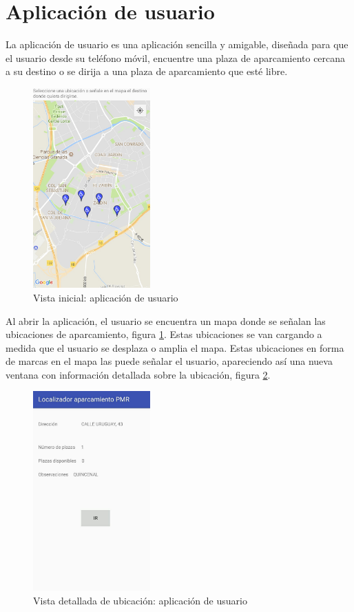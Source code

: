 \newpage
\section{Aplicación de usuario}
La aplicación de usuario es una aplicación sencilla y amigable, diseñada para que el usuario desde su teléfono móvil, encuentre una plaza de aparcamiento cercana a su destino o se dirija a una plaza de aparcamiento que esté libre.
\begin{figure}[H]
	\centering
	\includegraphics[width=0.4\textwidth]{imagenes/app/1.jpg}
	\caption{Vista inicial: aplicación de usuario}
	\label{app_1}
\end{figure}
Al abrir la aplicación, el usuario se encuentra un mapa donde se señalan las ubicaciones de aparcamiento, figura \ref{app_1}. Estas ubicaciones se van cargando a medida que el usuario se desplaza o amplia el mapa. Estas ubicaciones en forma de marcas en el mapa las puede señalar el usuario, apareciendo así una nueva ventana con información detallada sobre la ubicación, figura \ref{app_2}.
\begin{figure}[H]
	\centering
	\includegraphics[width=0.4\textwidth]{imagenes/app/2.jpg}
	\caption{Vista detallada de ubicación: aplicación de usuario}
	\label{app_2}
\end{figure}
